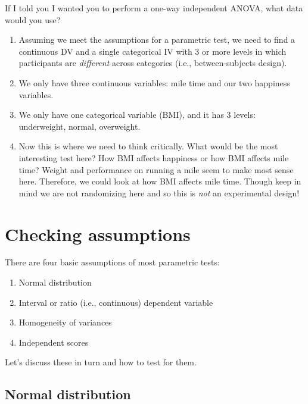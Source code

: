 \documentclass[
]{book}
\providecommand{\tightlist}{%
  \setlength{\itemsep}{0pt}\setlength{\parskip}{0pt}}
\begin{document}
If I told you I wanted you to perform a one-way independent ANOVA, what data would you use?

\begin{enumerate}
\def\labelenumi{\arabic{enumi}.}
\tightlist
\item
  Assuming we meet the assumptions for a parametric test, we need to find a continuous DV and a single categorical IV with 3 or more levels in which participants are \emph{different} across categories (i.e., between-subjects design).
\item
  We only have three continuous variables: mile time and our two happiness variables.
\item
  We only have one categorical variable (BMI), and it has 3 levels: underweight, normal, overweight.
\item
  Now this is where we need to think critically. What would be the most interesting test here? How BMI affects happiness or how BMI affects mile time? Weight and performance on running a mile seem to make most sense here. Therefore, we could look at how BMI affects mile time. Though keep in mind we are not randomizing here and so this is \emph{not} an experimental design!
\end{enumerate}

\hypertarget{checking-assumptions}{%
\section{Checking assumptions}\label{checking-assumptions}}

There are four basic assumptions of most parametric tests:

\begin{enumerate}
\def\labelenumi{\arabic{enumi}.}
\tightlist
\item
  Normal distribution
\item
  Interval or ratio (i.e., continuous) dependent variable
\item
  Homogeneity of variances
\item
  Independent scores
\end{enumerate}

Let's discuss these in turn and how to test for them.

\hypertarget{normal-distribution-1}{%
\subsection{Normal distribution}\label{normal-distribution-1}}
\end{document}
